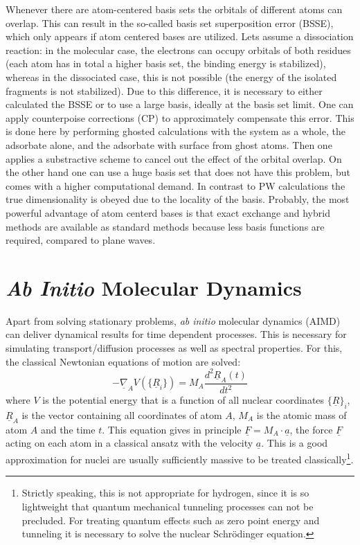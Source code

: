 \documentclass[11pt,DIV=13,BCOR=5mm,a4paper,headinclude]{scrbook}
\renewcommand{\vec}[1]{\underline{#1}}
\begin{document}
Whenever there are atom-centered basis sets the orbitals of different atoms can overlap.
This can result in the so-called basis set superposition error (BSSE), which only appears if atom centered bases are utilized.
Lets assume a dissociation reaction: in the molecular case, the electrons can occupy orbitals of both residues (each atom has in total a higher basis set, the binding energy is stabilized), whereas in the dissociated case, this is not possible (the energy of the isolated fragments is not stabilized).
Due to this difference, it is necessary to either calculated the BSSE or to use a large basis, ideally at the basis set limit.
One can apply counterpoise corrections (CP)\cite{Boys1970} to approximately compensate this error.
This is done here by performing ghosted calculations with the system as a whole, the adsorbate alone, and the adsorbate with surface from ghost atoms.
Then one applies a substractive scheme to cancel out the effect of the orbital overlap.
On the other hand one can use a huge basis set that does not have this problem, but comes with a higher computational demand.
In contrast to PW calculations the true dimensionality is obeyed due to the locality of the basis.
Probably, the most powerful advantage of atom centerd bases is that exact exchange and hybrid methods are available as standard methods because less basis functions are required, compared to plane waves.

\section{\textit{Ab Initio} Molecular Dynamics}
Apart from solving stationary problems, \textit{ab initio} molecular dynamics (AIMD) can deliver dynamical results for time dependent processes\cite{jensen,marx_hutter_AIMD}.
This is necessary for simulating transport/diffusion processes as well as spectral properties.
For this, the classical Newtonian equations of motion are solved:
\begin{equation}
 -\vec{\nabla}_A V(\{\vec{R}_i\})=M_A\frac{d^2 \vec{R}_A(t)}{dt^2}
\end{equation}
where $V$ is the potential energy that is a function of all nuclear coordinates $\{\vec{R}\}_i$, $\vec{R}_A$ is the vector containing all coordinates of atom $A$, $M_A$ is the atomic mass of atom $A$ and the time $t$.
This equation gives in principle $\vec{F}=M_A\cdot \vec{a}$, the force $\vec{F}$ acting on each atom in a classical ansatz with the velocity $\vec{a}$.
This is a good approximation for nuclei are usually sufficiently massive to be treated classically\footnote{Strictly speaking, this is not appropriate for hydrogen, since it is so lightweight that quantum mechanical tunneling processes can not be precluded.
For treating quantum effects such as zero point energy and tunneling it is necessary to solve the nuclear Schrödinger equation.}.
\end{document}
